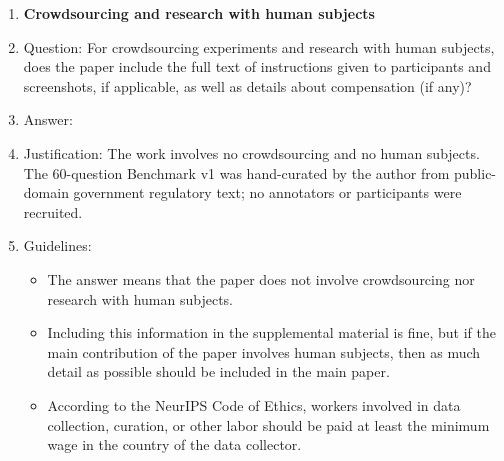 \begin{enumerate}
\item {\bf Crowdsourcing and research with human subjects}
    \item[] Question: For crowdsourcing experiments and research with human subjects, does the paper include the full text of instructions given to participants and screenshots, if applicable, as well as details about compensation (if any)?
    \item[] Answer: \answerNA{}
    \item[] Justification: The work involves no crowdsourcing and no human subjects. The 60-question Benchmark v1 was hand-curated by the author from public-domain government regulatory text; no annotators or participants were recruited.
    \item[] Guidelines:
    \begin{itemize}
        \item The answer \answerNA{} means that the paper does not involve crowdsourcing nor research with human subjects.
        \item Including this information in the supplemental material is fine, but if the main contribution of the paper involves human subjects, then as much detail as possible should be included in the main paper.
        \item According to the NeurIPS Code of Ethics, workers involved in data collection, curation, or other labor should be paid at least the minimum wage in the country of the data collector.
    \end{itemize}


\end{enumerate}

